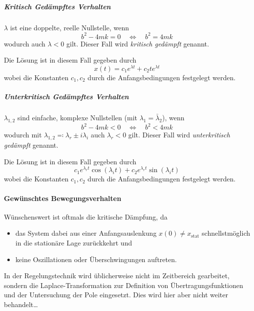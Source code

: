					\subparagraph{Kritisch Gedämpftes Verhalten}
						\( \lambda \) ist eine doppelte, reelle Nullstelle, wenn
						\begin{equation*}
							b^2 - 4mk = 0 \quad\iff\quad b^2 = 4mk
						\end{equation*}
						wodurch auch \( \lambda < 0 \) gilt. Dieser Fall wird \emph{kritisch gedämpft} genannt.
						
						Die Lösung ist in diesem Fall gegeben durch
						\begin{equation*}
							x(t) = c_1 e^{\lambda t} + c_2 t e^{\lambda t}
						\end{equation*}
						wobei die Konstanten \( c_1, c_2 \) durch die Anfangsbedingungen festgelegt werden.
					
					\subparagraph{Unterkritisch Gedämpftes Verhalten}
						\( \lambda_{1, 2} \) sind einfache, komplexe Nullstellen (mit \( \lambda_1 = \bar{\lambda}_2 \)), wenn
						\begin{equation*}
							b^2 - 4mk < 0 \quad\iff\quad b^2 < 4mk
						\end{equation*}
						wodurch mit \( \lambda_{1, 2} \eqqcolon \lambda_r \pm i \lambda_i \) auch \( \lambda_r < 0 \) gilt. Dieser Fall wird \emph{unterkritisch gedämpft} genannt.
						
						Die Lösung ist in diesem Fall gegeben durch
						\begin{equation*}
							c_1 e^{\lambda_r t} \cos(\lambda_i t) + c_2 e^{\lambda_r t} \sin(\lambda_i t)
						\end{equation*}
						wobei die Konstanten \( c_1, c_2 \) durch die Anfangsbedingungen festgelegt werden.

				\paragraph{Gewünschtes Bewegungsverhalten}
					Wünschenswert ist oftmals die kritische Dämpfung, da
					\begin{itemize}
						\item das System dabei aus einer Anfangsauslenkung \( x(0) \neq x_\text{stat} \) schnellstmöglich in die stationäre Lage zurückkehrt und
						\item keine Oszillationen oder Überschwingungen auftreten.
					\end{itemize}
				
					In der Regelungstechnik wird üblicherweise nicht im Zeitbereich gearbeitet, sondern die Laplace-Transformation zur Definition von Übertragungsfunktionen und der Untersuchung der Pole eingesetzt. Dies wird hier aber nicht weiter behandelt\dots

